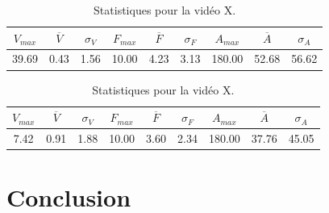 \begin{table}
	\centering
	\begin{tabular}{c c c c c c c c c}
		$V_{max}$	& $\overline{V}$	& $\sigma_{V}$	& $F_{max}$	& $\overline{F}$	& $\sigma_{F}$	& $A_{max}$	& $\overline{A}$	& $\sigma_{A}$	\bigstrut[b] \\ \hline

		39.69		& 0.43				& 1.56			& 10.00		& 4.23				& 3.13			& 180.00	& 52.68				& 56.62			\bigstrut[t] \\
	\end{tabular}
	\caption[Statistiques pour la vidéo X]{Statistiques pour la vidéo X.}
	\label{tab:mhA_stats}
\end{table}

\begin{table}
	\centering
	\begin{tabular}{c c c c c c c c c}
		$V_{max}$	& $\overline{V}$	& $\sigma_{V}$	& $F_{max}$	& $\overline{F}$	& $\sigma_{F}$	& $A_{max}$	& $\overline{A}$	& $\sigma_{A}$	\bigstrut[b] \\ \hline

		7.42		& 0.91				& 1.88			& 10.00		& 3.60				& 2.34			& 180.00	& 37.76				& 45.05			\bigstrut[t] \\
	\end{tabular}
	\caption[Statistiques pour la vidéo X]{Statistiques pour la vidéo X.}
	\label{tab:germanwingsA_stats}
\end{table}

\section{Conclusion}

\clearpage
